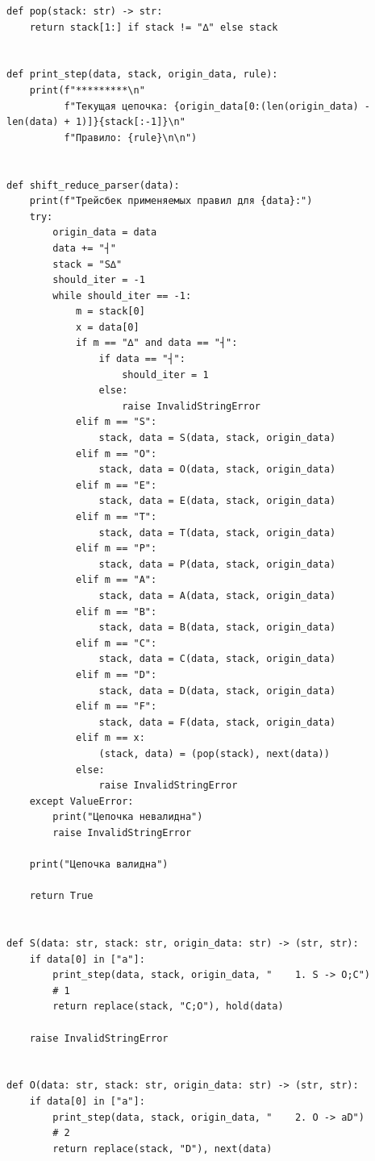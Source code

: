 \documentclass[a4paper,14pt]{extarticle}
\begin{document}
\begin{enumerate}[1.]
\begin{verbatim}
def pop(stack: str) -> str:
    return stack[1:] if stack != "∆" else stack


def print_step(data, stack, origin_data, rule):
    print(f"*********\n"
          f"Текущая цепочка: {origin_data[0:(len(origin_data) - len(data) + 1)]}{stack[:-1]}\n"
          f"Правило: {rule}\n\n")


def shift_reduce_parser(data):
    print(f"Трейсбек применяемых правил для {data}:")
    try:
        origin_data = data
        data += "┤"
        stack = "S∆"
        should_iter = -1
        while should_iter == -1:
            m = stack[0]
            x = data[0]
            if m == "∆" and data == "┤":
                if data == "┤":
                    should_iter = 1
                else:
                    raise InvalidStringError
            elif m == "S":
                stack, data = S(data, stack, origin_data)
            elif m == "O":
                stack, data = O(data, stack, origin_data)
            elif m == "E":
                stack, data = E(data, stack, origin_data)
            elif m == "T":
                stack, data = T(data, stack, origin_data)
            elif m == "P":
                stack, data = P(data, stack, origin_data)
            elif m == "A":
                stack, data = A(data, stack, origin_data)
            elif m == "B":
                stack, data = B(data, stack, origin_data)
            elif m == "C":
                stack, data = C(data, stack, origin_data)
            elif m == "D":
                stack, data = D(data, stack, origin_data)
            elif m == "F":
                stack, data = F(data, stack, origin_data)
            elif m == x:
                (stack, data) = (pop(stack), next(data))
            else:
                raise InvalidStringError
    except ValueError:
        print("Цепочка невалидна")
        raise InvalidStringError

    print("Цепочка валидна")

    return True


def S(data: str, stack: str, origin_data: str) -> (str, str):
    if data[0] in ["a"]:
        print_step(data, stack, origin_data, "    1. S -> O;C")
        # 1
        return replace(stack, "C;O"), hold(data)

    raise InvalidStringError


def O(data: str, stack: str, origin_data: str) -> (str, str):
    if data[0] in ["a"]:
        print_step(data, stack, origin_data, "    2. O -> aD")
        # 2
        return replace(stack, "D"), next(data)


\end{verbatim}
\end{enumerate}
\end{document}

